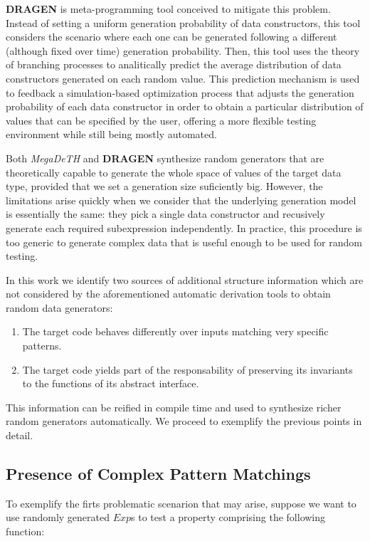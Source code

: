 \documentclass[conference]{IEEEtran}
\newcommand{\Conid}[1]{\mathit{#1}}
\newcommand{\megadeth}{\emph{MegaDeTH}\xspace}
\newcommand{\dragen}{\textbf{DRAGEN}\xspace}
\begin{document}
\dragen is meta-programming tool conceived to mitigate this problem.
%
Instead of setting a uniform generation probability of data constructors, this
tool considers the scenario where each one can be generated following a
different (although fixed over time) generation probability.
%
Then, this tool uses the theory of branching processes to analitically predict
the average distribution of data constructors generated on each random value.
%
This prediction mechanism is used to feedback a simulation-based optimization
process that adjusts the generation probability of each data constructor in
order to obtain a particular distribution of values that can be specified by the
user, offering a more flexible testing environment while still being mostly
automated.


Both \megadeth and \dragen synthesize random generators that are theoretically
capable to generate the whole space of values of the target data type, provided
that we set a generation size suficiently big.
%
However, the limitations arise quickly when we consider that the underlying
generation model is essentially the same: they pick a single data constructor
and recusively generate each required subexpression independently.
%
In practice, this procedure is too generic to generate complex data that is
useful enough to be used for random testing.


In this work we identify two sources of additional structure information which
are not considered by the aforementioned automatic derivation tools to obtain
random data generators:

\begin{enumerate}
\item The target code behaves differently over inputs matching very specific
  patterns.
\item The target code yields part of the responsability of preserving its
  invariants to the functions of its abstract interface.
\end{enumerate}

This information can be reified in compile time and used to synthesize richer
random generators automatically. We proceed to exemplify the previous points in
detail.

\subsection{\textbf{Presence of Complex Pattern Matchings}}

To exemplify the firts problematic scenarion that may arise, suppose we want to
use randomly generated \ensuremath{\Conid{Exp}}s to test a property comprising the following
function:
\end{document}
